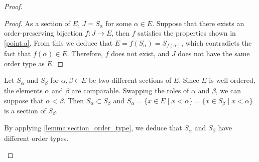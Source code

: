 \documentclass[11pt,a4paper,twoside]{article}
\theoremstyle{definition}
\begin{document}
\begin{proof}
\begin{enumerate}[(a)]
    \begin{proof}
      As a section of $E$, $J = S_\alpha$ for some $\alpha \in E$. Suppose that there exists an order-preserving bijection $f : J \to E$,
      then $f$ satisfies the properties shown in \ref{point:a}. From this we deduce that $E = f ( S_\alpha ) = S_{ f ( \alpha ) }$, which
      contradicts the fact that $f ( \alpha ) \in E$. Therefore, $f$ does not exist, and $J$ does not have the same order type as $E$.
    \end{proof}

    Let $S_\alpha$ and $S_\beta$ for $\alpha, \beta \in E$ be two different sections of $E$. Since $E$ is well-ordered,
    the elements $\alpha$ and $\beta$ are comparable. Swapping the roles of $\alpha$ and $\beta$, we can suppose that
    $\alpha < \beta$. Then $S_\alpha \subset S_\beta$ and $S_\alpha = \{ x \in E \mid x < \alpha \} = \{ x \in S_\beta \mid x < \alpha \}$
    is a section of $S_\beta$.

    By applying \cref{lemma:section_order_type}, we deduce that $S_\alpha$ and $S_\beta$ have different order types.

  \end{enumerate}

\end{proof}
\end{document}
